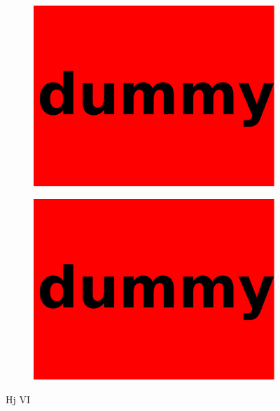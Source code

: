 \begin{figure}
\begin{subfigure}[]{0.49\textwidth}
	\includegraphics[width=\textwidth]{images/dummy.pdf}
\end{subfigure}
\hfill
\begin{subfigure}[]{0.49\textwidth}
	\includegraphics[width=\textwidth]{images/dummy.pdf}
\end{subfigure}
\caption{Hj VI}
\end{figure}
%
